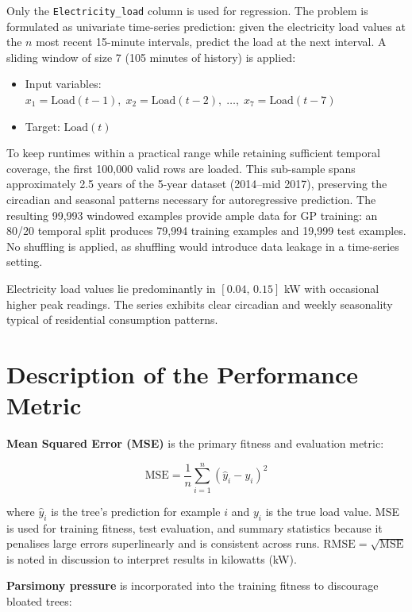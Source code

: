 \documentclass[12pt,a4paper]{article}
\begin{document}
Only the \texttt{Electricity\_load} column is used for regression. The problem is
formulated as univariate time-series prediction: given the electricity load values
at the $n$ most recent 15-minute intervals, predict the load at the next interval.
A sliding window of size 7 (105 minutes of history) is applied:

\begin{itemize}
  \item Input variables: $x_1 = \text{Load}(t{-}1),\; x_2 = \text{Load}(t{-}2),\; \ldots,\; x_7 = \text{Load}(t{-}7)$
  \item Target: $\text{Load}(t)$
\end{itemize}

To keep runtimes within a practical range while retaining sufficient temporal
coverage, the first 100,000 valid rows are loaded. This sub-sample spans
approximately 2.5 years of the 5-year dataset (2014--mid 2017), preserving the
circadian and seasonal patterns necessary for autoregressive prediction. The
resulting 99,993 windowed examples provide ample data for GP training: an 80/20
temporal split produces 79,994 training examples and 19,999 test examples. No
shuffling is applied, as shuffling would introduce data leakage in a time-series
setting.

Electricity load values lie predominantly in $[0.04,\, 0.15]$ kW with occasional
higher peak readings. The series exhibits clear circadian and weekly seasonality
typical of residential consumption patterns.

\section{Description of the Performance Metric}

\textbf{Mean Squared Error (MSE)} is the primary fitness and evaluation metric:

\[
\text{MSE} = \frac{1}{n} \sum_{i=1}^{n} (\hat{y}_i - y_i)^2
\]

where $\hat{y}_i$ is the tree's prediction for example $i$ and $y_i$ is the true
load value. MSE is used for training fitness, test evaluation, and summary statistics
because it penalises large errors superlinearly and is consistent across runs.
$\text{RMSE} = \sqrt{\text{MSE}}$ is noted in discussion to interpret results in
kilowatts (kW).

\textbf{Parsimony pressure} is incorporated into the training fitness to discourage
bloated trees:
\end{document}
